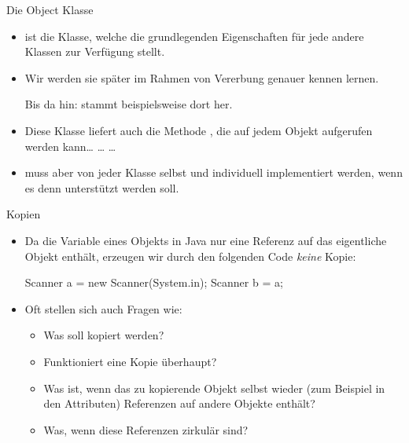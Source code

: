 {
\iffull
\AddonFrame
\begin{frame}[t,fragile]{Die Object Klasse}
    \begin{itemize}[<+(1)->]
        \itemsep10pt
        \item {} ist die Klasse, welche die grundlegenden Eigenschaften für jede andere Klassen zur Verfügung stellt.
        \item Wir werden sie später im Rahmen von Vererbung genauer kennen lernen.\par
            Bis da hin:  stammt beispielsweise dort her.
        \item Diese Klasse  liefert auch die Methode , die auf jedem Objekt aufgerufen werden kann\pause\ldots\pause{} \ldots\pause{} \ldots
        \item {} muss aber von jeder Klasse selbst und individuell implementiert werden, wenn es denn unterstützt werden soll.
    \end{itemize}
\end{frame}

\begin{frame}[t,fragile]{Kopien}
    \begin{itemize}[<+(1)->]
        \itemsep10pt
        \item Da die Variable eines Objekts in Java nur eine Referenz auf das eigentliche Objekt enthält, erzeugen wir durch den folgenden Code \textit{keine} Kopie:\pause{}
\begin{plainjava}
Scanner a = new Scanner(System.in);
Scanner b = a;
\end{plainjava}
        \item Oft stellen sich auch Fragen wie:
         \begin{itemize}
            \itemsep6pt
             \item Was soll kopiert werden?
             \item Funktioniert eine Kopie überhaupt?
             \item Was ist, wenn das zu kopierende Objekt selbst wieder (zum Beispiel in den Attributen) Referenzen auf andere Objekte enthält?
             \item Was, wenn diese Referenzen zirkulär sind?
         \end{itemize}
    \end{itemize}
\end{frame}

}
